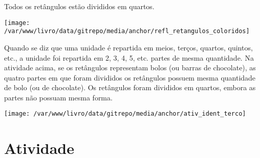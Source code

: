 \documentclass[a4paper,12pt,twoside]{book}
\begin{document}
\begin{resposta*}[breakable]{}{}  
  Todos os retângulos estão divididos em quartos.   
\end{resposta*}





\texttt{[image: /var/www/livro/data/gitrepo/media/anchor/refl\_retangulos\_coloridos]}



\begin{refletindo*}[breakable]{}{}  
  Quando se diz que uma unidade é repartida em meios, terços, quartos, quintos, etc., a unidade foi repartida em 2, 3, 4, 5, etc. partes de mesma quantidade.  
  Na atividade acima, se os retângulos representam bolos (ou barras de chocolate), as quatro partes em que foram divididos os retângulos possuem mesma quantidade de bolo (ou de chocolate).  
  Os retângulos foram divididos em quartos, embora as partes não possuam mesma forma.  
\end{refletindo*}


\texttt{[image: /var/www/livro/data/gitrepo/media/anchor/ativ\_ident\_terco]}
\section{Atividade}
\end{document}
